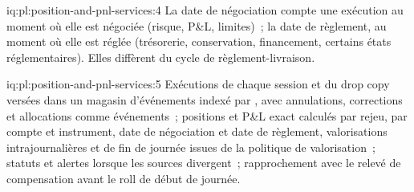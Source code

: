 \begin{solution}{iq:pl:position-and-pnl-services:4}
La date de négociation compte une exécution au moment où elle est négociée (risque, P\&L, limites)~; la date de règlement, au moment où elle est réglée (trésorerie, conservation, financement, certains états
réglementaires). Elles diffèrent du cycle de règlement-livraison.
\end{solution}

\begin{solution}{iq:pl:position-and-pnl-services:5}
Exécutions de chaque session et du drop copy versées dans un magasin d'événements indexé par , avec annulations, corrections et allocations comme
événements~; positions et P\&L exact calculés par rejeu, par compte et instrument, date de négociation et date de règlement, valorisations intrajournalières et de fin de journée
issues de la politique de valorisation~; statuts et alertes lorsque les sources divergent~; rapprochement avec le relevé de compensation avant le roll de début de journée.
\end{solution}
